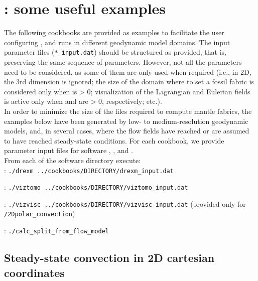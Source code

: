 \chapter{\cookbookstitle: some useful examples}
\label{chapter:cookbooks}

The following cookbooks are provided as examples to facilitate the user configuring  \drexmtitle{}, \viztomotitle{} and \skstitle{} runs in different geodynamic model domains. The input parameter files (\texttt{*\_input.dat}) should be structured as provided, that is, preserving the same sequence of parameters. However, not all the parameters need to be considered, as some of them are only used when required (i.e., in 2D, the 3rd dimension is ignored; the size of the domain where to set a fossil fabric is considered only when  is > 0; visualization of the Lagrangian and Eulerian fields is active only when  and  are > 0, respectively; etc.).\\  
In order to minimize the size of the \vtptitle{} files required to compute mantle fabrics, the examples below have been generated by low- to medium-resolution geodynamic models, and, in several cases, where the flow fields have reached or are assumed to have reached steady-state conditions.
For each cookbook, we provide parameter input files for software \drexmtitle{}, \viztomotitle{}, \vizvisctitle{} and \skstitle{}. \\
From each of the software directory execute:\\  

\drexmtitle{}: \texttt{./drexm ../cookbooks/DIRECTORY/drexm\_input.dat}

\viztomotitle{}: \texttt{./viztomo ../cookbooks/DIRECTORY/viztomo\_input.dat}

\vizvisctitle{}: \texttt{./vizvisc ../cookbooks/DIRECTORY/vizvisc\_input.dat} (provided only for \texttt{/2Dpolar\_convection})

\skstitle{}: \texttt{./calc\_split\_from\_flow\_model}\footnotemark



\vfill  %

\section{Steady-state convection in 2D cartesian coordinates}
\label{section:cookbook_2Dcartesianconvection}

